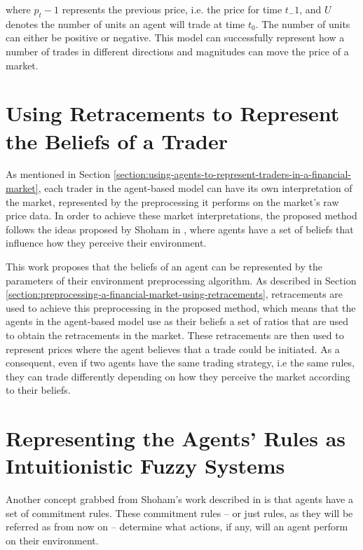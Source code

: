 where $p_t-1$ represents the previous price, i.e. the price for time $t_-1$, and
$U$ denotes the number of units an agent will trade at time $t_0$. The number of
units can either be positive or negative. This model can successfully represent
how a number of trades in different directions and magnitudes can move the price
of a market.

\section{Using Retracements to Represent the Beliefs of a Trader}
\label{section:using-retracements-to-represent-the-beliefs-of-a-trader}

As mentioned in Section
\ref{section:using-agents-to-represent-traders-in-a-financial-market}, each
trader in the agent-based model can have its own interpretation of the market,
represented by the preprocessing it performs on the market's raw price data. In
order to achieve these market interpretations, the proposed method follows the
ideas proposed by Shoham in \cite{Shoham1993}, where agents have a set of
beliefs that influence how they perceive their environment.

This work proposes that the beliefs of an agent can be represented by the
parameters of their environment preprocessing algorithm. As described in Section
\ref{section:preprocessing-a-financial-market-using-retracements}, retracements
are used to achieve this preprocessing in the proposed method, which means that
the agents in the agent-based model use as their beliefs a set of ratios that
are used to obtain the retracements in the market. These retracements are then
used to represent prices where the agent believes that a trade could be
initiated. As a consequent, even if two agents have the same trading strategy,
i.e the same rules, they can trade differently depending on how they perceive
the market according to their beliefs.

\section{Representing the Agents' Rules as Intuitionistic Fuzzy Systems}
\label{section:representing-the-agents-rules-as-intuitionistic-fuzzy-systems}

Another concept grabbed from Shoham's work described in \cite{Shoham1993} is
that agents have a set of commitment rules. These commitment rules -- or just
rules, as they will be referred as from now on -- determine what actions, if
any, will an agent perform on their environment.

